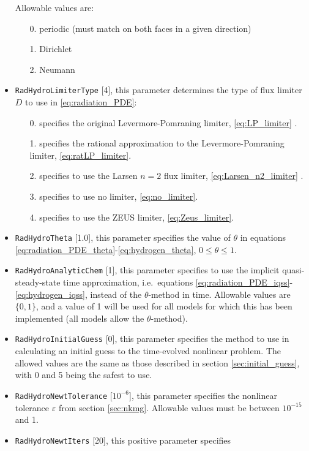 \documentclass[letterpaper,10pt]{article}
\renewcommand{\(}{\left(}
\renewcommand{\)}{\right)}
\begin{document}
\begin{itemize}
  Allowable values are:
  \begin{itemize}
  \item[0.] periodic (must match on both faces in a given direction)
  \item[1.] Dirichlet
  \item[2.] Neumann
  \end{itemize}
\item {\tt RadHydroLimiterType} [4], this parameter determines the
  type of flux limiter $D$ to use in \eqref{eq:radiation_PDE}:
  \begin{itemize}
  \item[0.] specifies the original Levermore-Pomraning limiter,
    \eqref{eq:LP_limiter} \cite{Levermore1984,LevermorePomraning1981}.
  \item[1.] specifies the rational approximation to the
    Levermore-Pomraning limiter, \eqref{eq:ratLP_limiter}.
  \item[2.] specifies to use the Larsen $n=2$ flux limiter,
    \eqref{eq:Larsen_n2_limiter} \cite{Morel2000}. 
  \item[3.] specifies to use no limiter, \eqref{eq:no_limiter}.
  \item[4.] specifies to use the ZEUS limiter, \eqref{eq:Zeus_limiter}.
  \end{itemize}
\item {\tt RadHydroTheta} [1.0], this parameter specifies the
  value of $\theta$ in equations
  \eqref{eq:radiation_PDE_theta}-\eqref{eq:hydrogen_theta},
  $0\le\theta\le 1$.
\item {\tt RadHydroAnalyticChem} [1], this parameter specifies to use
  the implicit quasi-steady-state time approximation, i.e.~equations
  \eqref{eq:radiation_PDE_iqss}-\eqref{eq:hydrogen_iqss}, instead of
  the $\theta$-method in time.  Allowable values are $\{0,1\}$, and a
  value of 1 will be used for all models for which this has been
  implemented (all models allow the $\theta$-method).
\item {\tt RadHydroInitialGuess} [0], this parameter specifies the
  method to use in calculating an initial guess to the time-evolved
  nonlinear problem.  The allowed values are the same as those
  described in section \ref{sec:initial_guess}, with 0 and 5 being the
  safest to use.
\item {\tt RadHydroNewtTolerance} [$10^{-6}$], this parameter
  specifies the nonlinear tolerance $\varepsilon$ from section
  \ref{sec:nkmg}.  Allowable values must be between $10^{-15}$ and 1.
\item {\tt RadHydroNewtIters} [20], this positive parameter specifies

\end{itemize}
\end{document}
